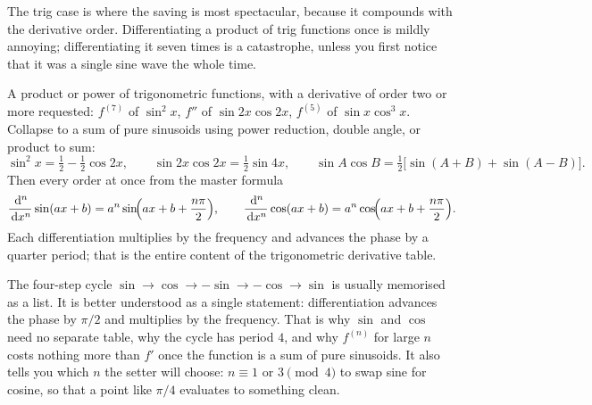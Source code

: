 The trig case is where the saving is most spectacular, because it compounds with the derivative order. Differentiating a product of trig functions once is mildly annoying; differentiating it seven times is a catastrophe, unless you first notice that it was a single sine wave the whole time.

\cue A product or power of trigonometric functions, with a derivative of order two or more requested: $f^{(7)}$ of $\sin^{2}x$, $f''$ of $\sin 2x\cos 2x$, $f^{(5)}$ of $\sin x\cos^{3}x$.
\method Collapse to a sum of pure sinusoids using power reduction, double angle, or product to sum:
\[
\sin^{2}x=\tfrac12-\tfrac12\cos 2x,\qquad \sin 2x\cos 2x=\tfrac12\sin 4x,\qquad \sin A\cos B=\tfrac12\bigl[\sin(A+B)+\sin(A-B)\bigr].
\]
Then every order at once from the master formula
\[
\frac{\,\mathrm{d}^{n}}{\,\mathrm{d} x^{n}}\sin(ax+b)=a^{n}\sin\!\Bigl(ax+b+\frac{n\pi}{2}\Bigr),\qquad
\frac{\,\mathrm{d}^{n}}{\,\mathrm{d} x^{n}}\cos(ax+b)=a^{n}\cos\!\Bigl(ax+b+\frac{n\pi}{2}\Bigr).
\]
Each differentiation multiplies by the frequency and advances the phase by a quarter period; that is the entire content of the trigonometric derivative table.

\begin{keynote}
The four-step cycle $\sin\to\cos\to-\sin\to-\cos\to\sin$ is usually memorised as a list. It is better understood as a single statement: differentiation advances the phase by $\pi/2$ and multiplies by the frequency. That is why $\sin$ and $\cos$ need no separate table, why the cycle has period $4$, and why $f^{(n)}$ for large $n$ costs nothing more than $f'$ once the function is a sum of pure sinusoids. It also tells you which $n$ the setter will choose: $n\equiv1$ or $3\pmod 4$ to swap sine for cosine, so that a point like $\pi/4$ evaluates to something clean.
\end{keynote}

